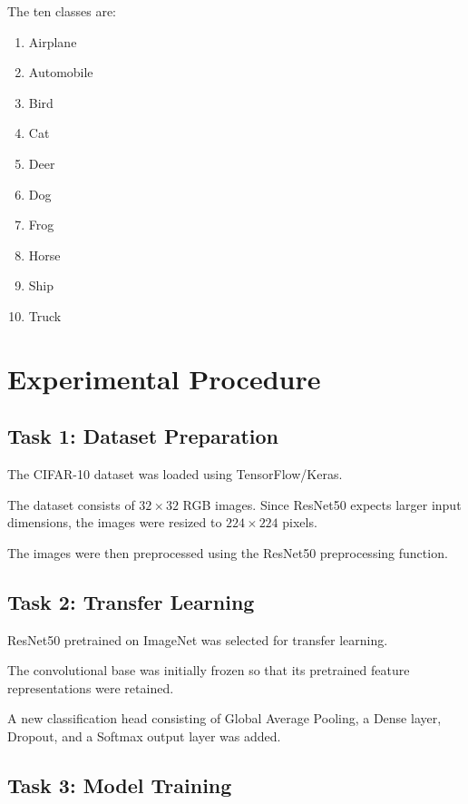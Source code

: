 \documentclass[12pt,a4paper]{article}
\begin{document}
The ten classes are:

\begin{enumerate}
    \item Airplane
    \item Automobile
    \item Bird
    \item Cat
    \item Deer
    \item Dog
    \item Frog
    \item Horse
    \item Ship
    \item Truck
\end{enumerate}


\section{Experimental Procedure}

\subsection{Task 1: Dataset Preparation}

The CIFAR-10 dataset was loaded using TensorFlow/Keras.

The dataset consists of $32\times32$ RGB images. Since ResNet50 expects larger input dimensions, the images were resized to $224\times224$ pixels.

The images were then preprocessed using the ResNet50 preprocessing function.

\subsection{Task 2: Transfer Learning}

ResNet50 pretrained on ImageNet was selected for transfer learning.

The convolutional base was initially frozen so that its pretrained feature representations were retained.

A new classification head consisting of Global Average Pooling, a Dense layer, Dropout, and a Softmax output layer was added.

\subsection{Task 3: Model Training}
\end{document}
